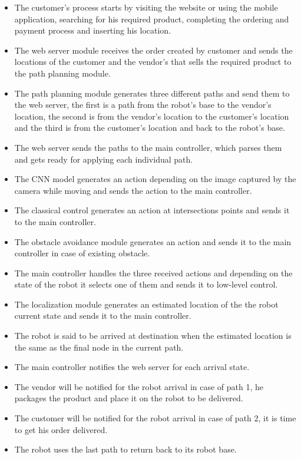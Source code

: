  \begin{itemize}

     \item The customer's process starts by visiting the website or using the mobile application, searching for his required product, completing the ordering and payment process and inserting his location.
     \item The web server module receives the order created by customer and sends the locations of the customer and the vendor's that sells the required product to the path planning module.
     \item The path planning module generates three different paths and send them to the web server, the first is a path from the robot's base to the vendor's location, the second is from the vendor's location to the customer's location and the third is from the customer's location and back to the robot's base. 
     \item The web server sends the paths to the main controller, which parses them and gets ready for applying each individual path. 
     \item The CNN model generates an action depending on the image captured by the camera while moving and sends the action to the main controller.
     \item The classical control generates an action at intersections points and sends it to the main controller.
     \item The obstacle avoidance module generates an action and sends it to the main controller in case of existing obstacle.
     \item The main controller handles the three received actions and depending on the state of the robot it selects one of them and sends it to low-level control.
     \item The localization module generates an estimated location of the the robot current state and sends it to the main controller.
     \item The robot is said to be arrived at destination when the estimated location is the same as the final node in the current path. 
     \item The main controller notifies the web server for each arrival state.
     \item The vendor will be notified for the robot arrival in case of path 1, he packages the product and place it on the robot to be delivered.
     \item The customer will be notified for the robot arrival in case of path 2, it is time to get his order delivered.
     \item The robot uses the last path to return back to its robot base.
 \end{itemize}
 
